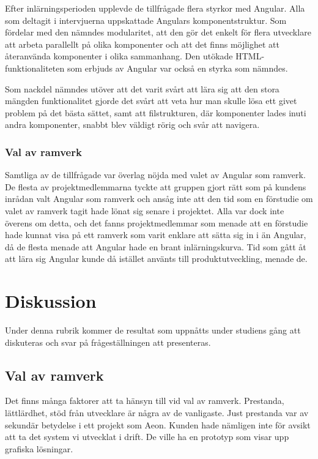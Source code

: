 Efter inlärningsperioden upplevde de tillfrågade flera styrkor med Angular. Alla som deltagit i intervjuerna uppskattade Angulars komponentstruktur. Som fördelar med den nämndes modularitet, att den gör det enkelt för flera utvecklare att arbeta parallellt på olika komponenter och att det finns möjlighet att återanvända komponenter i olika sammanhang. Den utökade HTML-funktionaliteten som erbjuds av Angular var också en styrka som nämndes.

Som nackdel nämndes utöver att det varit svårt att lära sig att den stora mängden funktionalitet gjorde det svårt att veta hur man skulle lösa ett givet problem på det bästa sättet, samt att filstrukturen, där komponenter lades inuti andra komponenter, snabbt blev väldigt rörig och svår att navigera.

\subsubsection{Val av ramverk}

Samtliga av de tillfrågade var överlag nöjda med valet av Angular som ramverk. De flesta av projektmedlemmarna tyckte att gruppen gjort rätt som på kundens inrådan valt Angular som ramverk och ansåg inte att den tid som en förstudie om valet av ramverk tagit hade lönat sig senare i projektet. Alla var dock inte överens om detta, och det fanns projektmedlemmar som menade att en förstudie hade kunnat visa på ett ramverk som varit enklare att sätta sig in i än Angular, då de flesta menade att Angular hade en brant inlärningskurva. Tid som gått åt att lära sig Angular kunde då istället använts till produktutveckling, menade de.   


\section{Diskussion}

Under denna rubrik kommer de resultat som uppnåtts under studiens gång att diskuteras och svar på frågeställningen att presenteras.

\subsection{Val av ramverk}

Det finns många faktorer att ta hänsyn till vid val av ramverk. Prestanda, lättlärdhet, stöd från utvecklare är några av de vanligaste. Just prestanda var av sekundär betydelse i ett projekt som Aeon. Kunden hade nämligen inte för avsikt att ta det system vi utvecklat i drift. De ville ha en prototyp som visar upp grafiska lösningar. 


